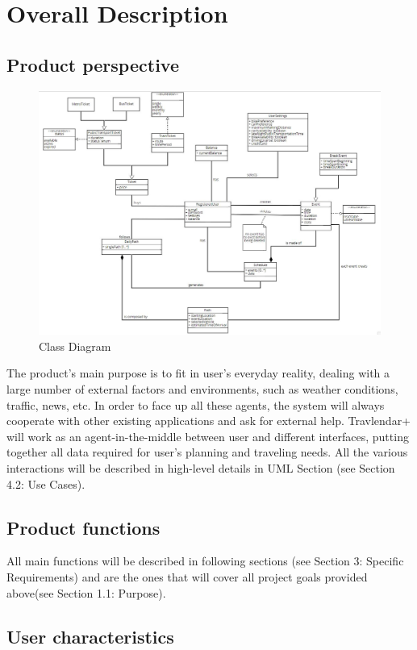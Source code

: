 \documentclass{article}
\begin{document}
\section{Overall Description}
\subsection{Product perspective}
\begin{figure}[H]
\includegraphics[width=\linewidth]{Class_Diagram}
\caption{Class Diagram}
\label{fig:CD}
\end{figure}

The product’s main purpose is to fit in user’s everyday reality, dealing with a large number of external factors and environments, such as weather conditions, traffic, news, etc. In order to face up all these agents, the system will always cooperate with other existing applications and ask for external help. Travlendar+ will work as an agent-in-the-middle between user and different interfaces, putting together all data required for user’s planning and traveling needs. All the various interactions will be described in high-level details in UML Section (see Section 4.2: Use Cases). 
\subsection{Product functions}
All main functions will be described in following sections (see Section 3: Specific Requirements) and are the ones that will cover all project goals provided above(see Section 1.1: Purpose). 
\subsection{User characteristics}
\end{document}
